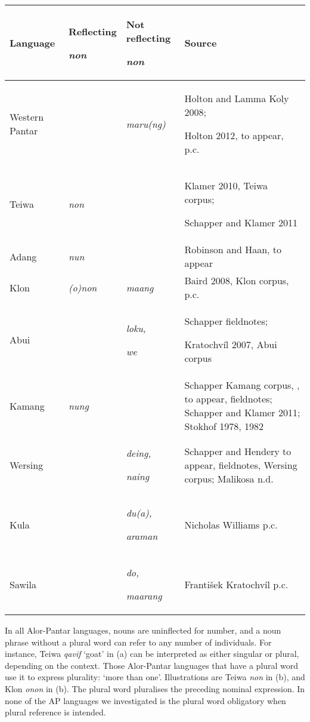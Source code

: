 \begin{flushleft}
\tablehead{}
\begin{supertabular}{|m{0.8816598in}|m{0.90595984in}|m{1.1545599in}|m{3.35666in}|}
\hline
\bfseries Language  &
{\bfseries Reflecting }

\bfseries\itshape *non &
{\bfseries Not reflecting }

\bfseries\itshape *non  &
\bfseries Source\\\hline
Western Pantar &
 &
\itshape maru(ng) &
Holton and Lamma Koly 2008;  

Holton 2012, to appear, p.c.\\\hline
Teiwa &
\itshape non &
 &
Klamer 2010, Teiwa corpus;  

Schapper and Klamer 2011\\\hline
Adang &
\itshape nun &
 &
Robinson and Haan, to appear \\\hline
Klon &
\itshape (o)non &
\itshape maang &
Baird 2008, Klon corpus, p.c. \\\hline
Abui &
 &
{\itshape loku,}

\itshape we &
Schapper fieldnotes;  

Kratochv\'il 2007, Abui corpus\\\hline
Kamang &
\itshape nung &
 &
Schapper Kamang corpus, , to appear, fieldnotes; Schapper and Klamer 2011;  Stokhof 1978, 1982\\\hline
Wersing &
 &
{\itshape deing,}

\itshape naing &
Schapper and Hendery to appear, fieldnotes,  Wersing corpus; Malikosa n.d.\\\hline
Kula &
 &
{\itshape du(a),}

\itshape araman &
Nicholas Williams p.c.\\\hline
Sawila &
 &
{\itshape do,}

\itshape maarang &
Franti\v{s}ek Kratochv\'il p.c.\\\hline
\end{supertabular}
\end{flushleft}
In all Alor-Pantar languages, nouns are uninflected for number, and a noun phrase without a plural word can refer to any number of individuals. For instance, Teiwa \textit{qavif }{\textquoteleft}goat{\textquoteright} in (a) can be interpreted as either singular or plural, depending on the context. Those Alor-Pantar languages that have a plural word use it to express plurality: {\textquoteleft}more than one{\textquoteright}. Illustrations are Teiwa \textit{non} in (b), and Klon \textit{onon }in (b). The plural word pluralises the preceding nominal expression. In none of the AP languages we investigated is the plural word obligatory when plural reference is intended. 

